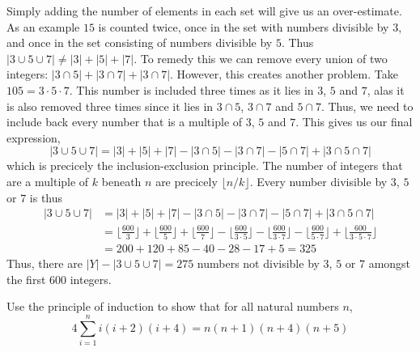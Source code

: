 \documentclass[a4paper, english, 12pt]{article} %
\begin{document}
\begin{answer}
  Simply adding the number of elements in each set will give us an
  over-estimate. As an example $15$ is counted twice, once in the set with numbers divisible
  by 3, and once in the set consisting of numbers divisible by $5$. Thus
  $|3 \cup 5 \cup 7| \neq |3| + |5|+|7|$. To remedy
  this we can remove every union of two integers: $|3 \cap 5| + |3 \cap 7|
  + |3 \cap 7|$. However, this creates another problem. Take $105 = 3 \cdot 5 \cdot
  7$. This number is included three times as it lies in $3$, $5$ and $7$, alas
  it is also removed three times since it lies in $3 \cap 5$, $3 \cap 7$ and $5
  \cap 7$. Thus, we need to include back every number that is a multiple of $3$,
  $5$ and $7$. This gives us our final expression,
  \begin{equation*}
    |3 \cup 5 \cup 7| = |3| + |5| + |7| - |3 \cap 5| - |3 \cap 7| - |5 \cap 7| + |3 \cap 5 \cap 7| 
  \end{equation*}
  which is precicely the inclusion-exclusion principle.
  The number of integers that are a multiple of $k$ beneath $n$ are precicely
  $\lfloor {n/k} \rfloor$. Every number divisible by $3$, $5$ or $7$ is thus
  \begin{align*}
        |3 \cup 5 \cup 7|
    & = |3| + |5| + |7| - |3 \cap 5| - |3 \cap 7| - |5 \cap 7| + |3 \cap 5 \cap 7| \\
    & = \lfloor \frac{600}{3} \rfloor
    +   \lfloor \frac{600}{5}  \rfloor
    +  \lfloor \frac{600}{7}  \rfloor  
    -  \lfloor \frac{600}{3\cdot 5}  \rfloor
    -  \lfloor \frac{600}{3\cdot 7}  \rfloor 
    -  \lfloor \frac{600}{5 \cdot 7}  \rfloor
      +  \lfloor \frac{600}{3\cdot 5\cdot 7} \rfloor  \\
    & = 200 + 120 + 85 - 40 - 28 - 17 + 5 
      = 325
  \end{align*}
  Thus, there are $|Y| - |3 \cup 5 \cup 7| = 275$ numbers not divisible by $3$,
  $5$ or $7$ amongst the first $600$ integers.
\end{answer}

\begin{problem}
  Use the principle of induction to show that for all natural numbers $n$,
  \begin{equation*}
    4 \sum_{i=1}^n i(i+2)(i+4) = n(n+1)(n+4)(n+5)
  \end{equation*}
\end{problem}
\end{document}
